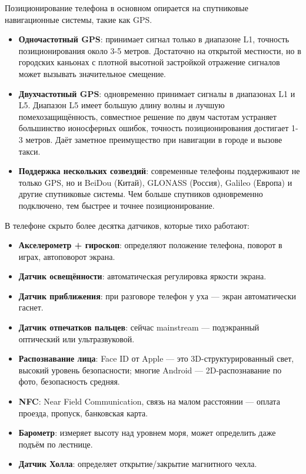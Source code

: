 
Позиционирование телефона в основном опирается на спутниковые навигационные системы, такие как GPS.

\begin{itemize}
  \item \textbf{Одночастотный GPS}: принимает сигнал только в диапазоне L1, точность позиционирования около 3-5 метров. Достаточно на открытой местности, но в городских каньонах с плотной высотной застройкой отражение сигналов может вызывать значительное смещение.
  \item \textbf{Двухчастотный GPS}: одновременно принимает сигналы в диапазонах L1 и L5. Диапазон L5 имеет большую длину волны и лучшую помехозащищённость, совместное решение по двум частотам устраняет большинство ионосферных ошибок, точность позиционирования достигает 1-3 метров. Даёт заметное преимущество при навигации в городе и вызове такси.
  \item \textbf{Поддержка нескольких созвездий}: современные телефоны поддерживают не только GPS, но и BeiDou (Китай), GLONASS (Россия), Galileo (Европа) и другие спутниковые системы. Чем больше спутников одновременно подключено, тем быстрее и точнее позиционирование.
\end{itemize}


В телефоне скрыто более десятка датчиков, которые тихо работают:

\begin{itemize}
  \item \textbf{Акселерометр + гироскоп}: определяют положение телефона, поворот в играх, автоповорот экрана.
  \item \textbf{Датчик освещённости}: автоматическая регулировка яркости экрана.
  \item \textbf{Датчик приближения}: при разговоре телефон у уха — экран автоматически гаснет.
  \item \textbf{Датчик отпечатков пальцев}: сейчас mainstream — подэкранный оптический или ультразвуковой.
  \item \textbf{Распознавание лица}: Face ID от Apple — это 3D-структурированный свет, высокий уровень безопасности; многие Android — 2D-распознавание по фото, безопасность средняя.
  \item \textbf{NFC}: Near Field Communication, связь на малом расстоянии — оплата проезда, пропуск, банковская карта.
  \item \textbf{Барометр}: измеряет высоту над уровнем моря, может определить даже подъём по лестнице.
  \item \textbf{Датчик Холла}: определяет открытие/закрытие магнитного чехла.
\end{itemize}

